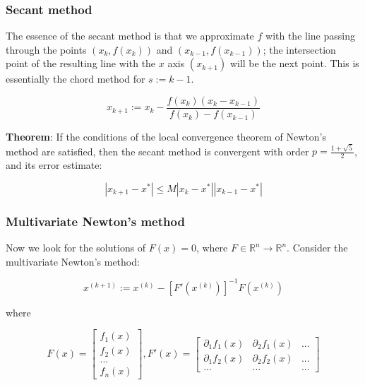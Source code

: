 \documentclass[margin=0px]{article}
\begin{document}
\subsubsection{Secant method}
The essence of the secant method is that we approximate $f$ with the line passing through the points $(x_{k},f(x_{k}))$ and $(x_{k-1},f(x_{k-1}))$;
the intersection point of the resulting line with the $x$ axis $(x_{k+1})$ will be the next point. This is
essentially the chord method for $s := k - 1$.

\begin{displaymath}
    x_{k+1} :=
    x_{k} -
    \frac
    {f(x_{k}) (x_{k} -x_{k-1}) }
    {f(x_{k}) - f(x_{k-1})}
\end{displaymath}

\noindent \textbf{Theorem}: If the conditions of the local convergence theorem of Newton's method are satisfied, then the secant method
is convergent with order $p = \frac{1+\sqrt{5}}{2}$, and its error estimate:

\begin{displaymath}
    |x_{k+1} - x^{*}| \leq M|x_{k}-x^{*}||x_{k-1}-x^{*}|
\end{displaymath}

\subsubsection{Multivariate Newton's method}

Now we look for the solutions of $F(x) = 0$, where $F \in \mathbb{R}^{n} \to \mathbb{R}^{n}$. Consider the multivariate Newton's method:

\begin{displaymath}
    x^{(k+1)} := x^{(k)} - [F'(x^{(k)})]^{-1}F(x^{(k)})
\end{displaymath}

\noindent where

\begin{displaymath}
    F(x) = \begin{bmatrix}
        f_{1}(x) \\[0.3em]
        f_{2}(x) \\[0.3em]
        ...      \\[0.3em]
        f_{n}(x)
    \end{bmatrix},
    F'(x) = \begin{bmatrix}
        \partial_{1}f_{1}(x) & \partial_{2}f_{1}(x) & ... \\[0.3em]
        \partial_{1}f_{2}(x) & \partial_{2}f_{2}(x) & ... \\[0.3em]
        ...                  & ...                  & ...
    \end{bmatrix}
\end{displaymath}
\end{document}
